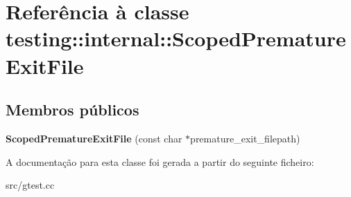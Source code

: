 \hypertarget{classtesting_1_1internal_1_1ScopedPrematureExitFile}{\section{Referência à classe testing\-:\-:internal\-:\-:Scoped\-Premature\-Exit\-File}
\label{classtesting_1_1internal_1_1ScopedPrematureExitFile}
}
\subsection*{Membros públicos}
\begin{DoxyCompactItemize}
\item 
\hypertarget{classtesting_1_1internal_1_1ScopedPrematureExitFile_ae520883b8a6984a864ce675acedff4a2}{{\bfseries Scoped\-Premature\-Exit\-File} (const char $\ast$premature\-\_\-exit\-\_\-filepath)}\label{classtesting_1_1internal_1_1ScopedPrematureExitFile_ae520883b8a6984a864ce675acedff4a2}

\end{DoxyCompactItemize}


A documentação para esta classe foi gerada a partir do seguinte ficheiro\-:\begin{DoxyCompactItemize}
\item 
src/gtest.\-cc\end{DoxyCompactItemize}
